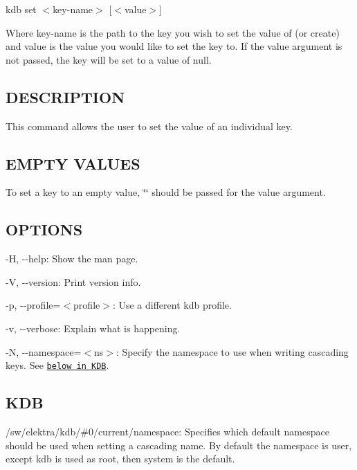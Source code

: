 {\ttfamily kdb set $<$key-\/name$>$ \mbox{[}$<$value$>$\mbox{]}}

Where {\ttfamily key-\/name} is the path to the key you wish to set the value of (or create) and {\ttfamily value} is the value you would like to set the key to. If the {\ttfamily value} argument is not passed, the key will be set to a value of {\ttfamily null}.

\subsection*{D\+E\+S\+C\+R\+I\+P\+T\+I\+O\+N}

This command allows the user to set the value of an individual key.

\subsection*{E\+M\+P\+T\+Y V\+A\+L\+U\+E\+S}

To set a key to an empty value, {\ttfamily \char`\"{}\char`\"{}} should be passed for the {\ttfamily value} argument.

\subsection*{O\+P\+T\+I\+O\+N\+S}


\begin{DoxyItemize}
\item {\ttfamily -\/\+H}, {\ttfamily -\/-\/help}\+: Show the man page.
\item {\ttfamily -\/\+V}, {\ttfamily -\/-\/version}\+: Print version info.
\item {\ttfamily -\/p}, {\ttfamily -\/-\/profile}=$<$profile$>$\+: Use a different kdb profile.
\item {\ttfamily -\/v}, {\ttfamily -\/-\/verbose}\+: Explain what is happening.
\item {\ttfamily -\/\+N}, {\ttfamily -\/-\/namespace}=$<$ns$>$\+: Specify the namespace to use when writing cascading keys. See \href{#KDB}{\tt below in K\+D\+B}.
\end{DoxyItemize}

\subsection*{K\+D\+B}


\begin{DoxyItemize}
\item {\ttfamily /sw/elektra/kdb/\#0/current/namespace}\+: Specifies which default namespace should be used when setting a cascading name. By default the namespace is user, except {\ttfamily kdb} is used as root, then {\ttfamily system} is the default.
\end{DoxyItemize}

